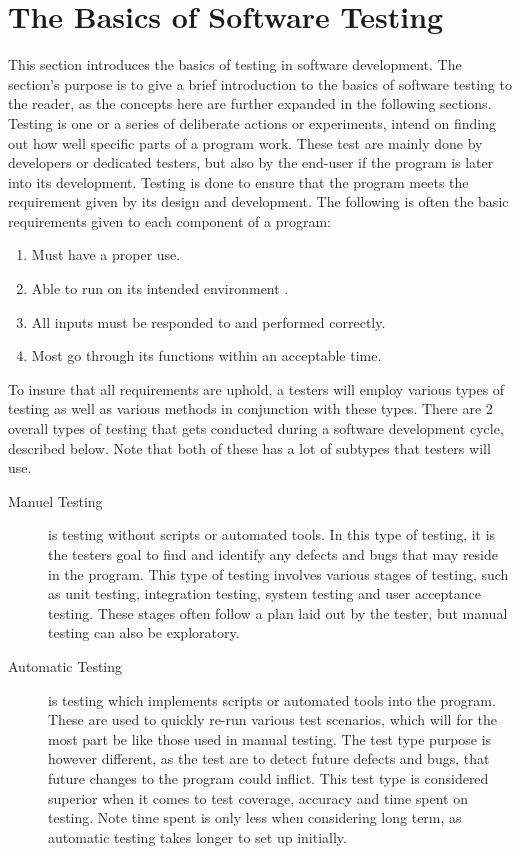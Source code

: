 \section{The Basics of Software Testing}\label{sect:btesting}
This section introduces the basics of testing in software development. The section's purpose is to give a brief introduction to the basics of software testing to the reader, as the concepts here are further expanded in the following sections.
Testing is one or a series of deliberate actions or experiments, intend on finding out how well specific parts of a program work. These test are mainly done by developers or dedicated testers, but also by the end-user if the program is later into its development. 
Testing is done to ensure that the program meets the requirement given by its design and development. The following is often the basic requirements given to each component of a program:
\begin{enumerate}
	\item Must have a proper use.
	\item Able to run on its intended environment .
	\item All inputs must be responded to and performed correctly. 
	\item Most go through its functions within an acceptable time.
\end{enumerate}
To insure that all requirements are uphold, a testers will employ various types of testing as well as various methods in conjunction with these types.
There are 2 overall types of testing that gets conducted during a software development cycle\cite{BasicTesting1}, described below. Note that both of these has a lot of subtypes that testers will use.
\begin{description}
\item [Manuel Testing] is testing without scripts or automated tools. In this type of testing, it is the testers goal to find and identify any defects and bugs that may reside in the program. This type of testing involves various stages of testing, such as unit testing, integration testing, system testing and user acceptance testing. These stages often follow a plan laid out by the tester, but manual testing can also be exploratory.  
\item [Automatic Testing] is testing which implements scripts or automated tools into the program. These are used to quickly re-run various test scenarios, which will for the most part be like those used in manual testing. The test type purpose is however different, as the test are to detect future defects and bugs, that future changes to the program could inflict. This test type is considered superior when it comes to test coverage, accuracy and time spent on testing. Note time spent is only less when considering long term, as automatic testing takes longer to set up initially.
\end{description}
